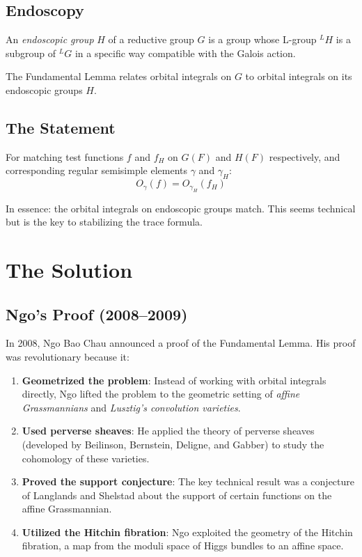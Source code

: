 \subsection{Endoscopy}

\begin{definition}
An \emph{endoscopic group} $H$ of a reductive group $G$ is a group whose L-group $^LH$ is a subgroup of $^LG$ in a specific way compatible with the Galois action.
\end{definition}

The Fundamental Lemma relates orbital integrals on $G$ to orbital integrals on its endoscopic groups $H$.

\subsection{The Statement}

\begin{conjecture}
For matching test functions $f$ and $f_H$ on $G(F)$ and $H(F)$ respectively, and corresponding regular semisimple elements $\gamma$ and $\gamma_H$:
\begin{equation}
O_\gamma(f) = O_{\gamma_H}(f_H)
\end{equation}
\end{conjecture}

In essence: the orbital integrals on endoscopic groups match. This seems technical but is the key to stabilizing the trace formula.

\section{The Solution}

\subsection{Ngo's Proof (2008--2009)}

In 2008, Ngo Bao Chau announced a proof of the Fundamental Lemma. His proof was revolutionary because it:

\begin{enumerate}
\item \textbf{Geometrized the problem}: Instead of working with orbital integrals directly, Ngo lifted the problem to the geometric setting of \emph{affine Grassmannians} and \emph{Lusztig's convolution varieties}.
\item \textbf{Used perverse sheaves}: He applied the theory of perverse sheaves (developed by Beilinson, Bernstein, Deligne, and Gabber) to study the cohomology of these varieties.
\item \textbf{Proved the support conjecture}: The key technical result was a conjecture of Langlands and Shelstad about the support of certain functions on the affine Grassmannian.
\item \textbf{Utilized the Hitchin fibration}: Ngo exploited the geometry of the Hitchin fibration, a map from the moduli space of Higgs bundles to an affine space.
\end{enumerate}


